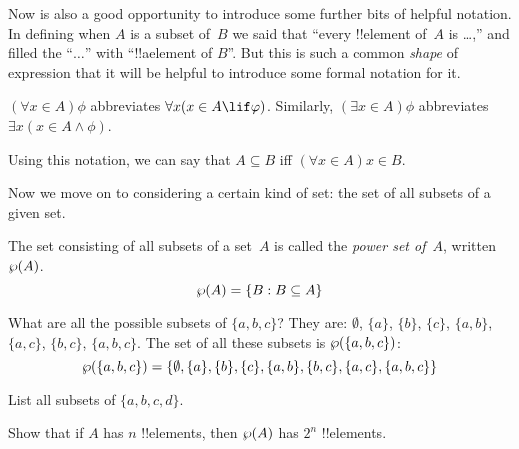 \documentclass[../../../include/open-logic-section]{subfiles}
\begin{document}
Now is also a good opportunity to introduce some further bits of
helpful notation. In defining when $A$ is a subset of~$B$ we said that
``every !!{element} of~$A$ is \dots,'' and filled the ``$\dots$'' with
``!!a{element} of $B$''. But this is such a common \emph{shape} of
expression that it will be helpful to introduce some formal notation
for it.

\begin{defn}
$(\forall x \in A)\phi$ abbreviates $\forall x(x \in A \lif
\phi)$. Similarly, $(\exists x \in A)\phi$ abbreviates $\exists x(x
\in A \land \phi)$. 
\end{defn}

Using this notation, we can say that $A \subseteq B$ iff $(\forall
x \in A)x \in B$. 

Now we move on to considering a certain kind of set: the set of all
subsets of a given set. 

\begin{defn}
The set consisting of all subsets of a set~$A$ is called the
\emph{power set of}~$A$, written $\wp(A)$.
  \[
    \wp(A) = \{ B : B \subseteq A \} 
  \]
\end{defn}

\begin{ex}
What are all the possible subsets of $\{ a, b, c \}$? They are:
$\emptyset$, $\{a \}$, $\{b\}$, $\{c\}$, $\{a, b\}$, $\{a, c\}$, $\{b,
c\}$, $\{a, b, c\}$. The set of all these subsets is
$\wp(\{a,b,c\})$:
\[
\wp(\{ a, b, c \}) = \{\emptyset, \{a \}, \{b\}, \{c\}, \{a, b\},
\{b, c\}, \{a, c\}, \{a, b, c\}\}
\]
\end{ex}

\begin{prob}
List all subsets of $\{a, b, c, d\}$.
\end{prob}

\begin{prob}
Show that if $A$ has $n$ !!{element}s, then $\wp(A)$ has $2^n$
!!{element}s.
\end{prob}
\end{document}
